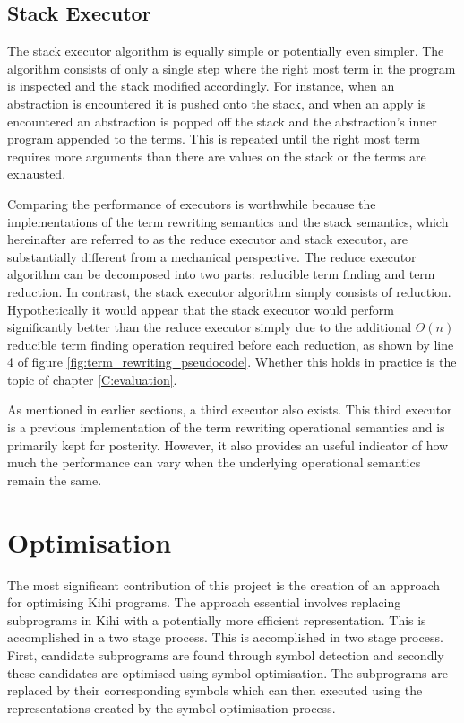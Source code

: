 \subsection{Stack Executor}


The stack executor algorithm is equally simple or potentially even simpler. The algorithm consists of only a single step where the right most term in the program is inspected and the stack modified accordingly. For instance, when an abstraction is encountered it is pushed onto the stack, and when an apply is encountered an abstraction is popped off the stack and the abstraction's inner program appended to the terms. This is repeated until the right most term requires more arguments than there are values on the stack or the terms are exhausted.

Comparing the performance of executors is worthwhile because the implementations of the term rewriting semantics and the stack semantics, which hereinafter are referred to as the reduce executor and stack executor, are substantially different from a mechanical perspective. The reduce executor algorithm can be decomposed into two parts: reducible term finding and term reduction. In contrast, the stack executor algorithm simply consists of reduction.  Hypothetically it would appear that the stack executor would perform significantly better than the reduce executor simply due to the additional $\Theta(n)$ reducible term finding operation required before each reduction, as shown by line 4 of figure \ref{fig:term_rewriting_pseudocode}. Whether this holds in practice is the topic of chapter \ref{C:evaluation}.

As mentioned in earlier sections, a third executor also exists. This third executor is a previous implementation of the term rewriting operational semantics and is primarily kept for posterity. However, it also provides an useful indicator of how much the performance can vary when the underlying operational semantics remain the same.


\section{Optimisation}\label{sec:implementation_optimisation}




The most significant contribution of this project is the creation of an approach for optimising Kihi programs. The approach essential involves replacing subprograms in Kihi with a potentially more efficient representation. This is accomplished in a two stage process. This is accomplished in two stage process. First, candidate subprograms are found through symbol detection and secondly these candidates are optimised using symbol optimisation. The subprograms are replaced by their corresponding symbols which can then executed using the representations created by the symbol optimisation process.

